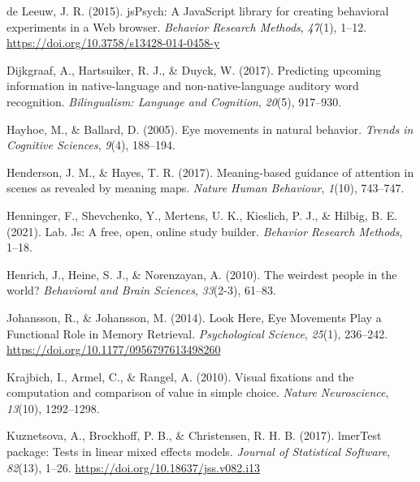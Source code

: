 \documentclass[
  man,floatsintext]{apa6}
\newlength{\cslhangindent}
\newlength{\cslentryspacingunit} %
\newenvironment{CSLReferences}[2] %
 {%
  \setlength{\parindent}{0pt}
  \ifodd #1
  \let\oldpar\par
  \def\par{\hangindent=\cslhangindent\oldpar}
  \fi
  \setlength{\parskip}{#2\cslentryspacingunit}
 }%
 {}
\begin{document}
\begin{CSLReferences}{1}{0}
\leavevmode{}%
de Leeuw, J. R. (2015). {jsPsych}: {A JavaScript} library for creating behavioral experiments in a {Web} browser. \emph{Behavior Research Methods}, \emph{47}(1), 1--12. \url{https://doi.org/10.3758/s13428-014-0458-y}

\leavevmode{}%
Dijkgraaf, A., Hartsuiker, R. J., \& Duyck, W. (2017). Predicting upcoming information in native-language and non-native-language auditory word recognition. \emph{Bilingualism: Language and Cognition}, \emph{20}(5), 917--930.

\leavevmode{}%
Hayhoe, M., \& Ballard, D. (2005). Eye movements in natural behavior. \emph{Trends in Cognitive Sciences}, \emph{9}(4), 188--194.

\leavevmode{}%
Henderson, J. M., \& Hayes, T. R. (2017). Meaning-based guidance of attention in scenes as revealed by meaning maps. \emph{Nature Human Behaviour}, \emph{1}(10), 743--747.

\leavevmode{}%
Henninger, F., Shevchenko, Y., Mertens, U. K., Kieslich, P. J., \& Hilbig, B. E. (2021). Lab. Js: A free, open, online study builder. \emph{Behavior Research Methods}, 1--18.

\leavevmode{}%
Henrich, J., Heine, S. J., \& Norenzayan, A. (2010). The weirdest people in the world? \emph{Behavioral and Brain Sciences}, \emph{33}(2-3), 61--83.

\leavevmode{}%
Johansson, R., \& Johansson, M. (2014). Look {Here}, {Eye Movements Play} a {Functional Role} in {Memory Retrieval}. \emph{Psychological Science}, \emph{25}(1), 236--242. \url{https://doi.org/10.1177/0956797613498260}

\leavevmode{}%
Krajbich, I., Armel, C., \& Rangel, A. (2010). Visual fixations and the computation and comparison of value in simple choice. \emph{Nature Neuroscience}, \emph{13}(10), 1292--1298.

\leavevmode{}%
Kuznetsova, A., Brockhoff, P. B., \& Christensen, R. H. B. (2017). {lmerTest} package: Tests in linear mixed effects models. \emph{Journal of Statistical Software}, \emph{82}(13), 1--26. \url{https://doi.org/10.18637/jss.v082.i13}


\end{CSLReferences}
\end{document}
